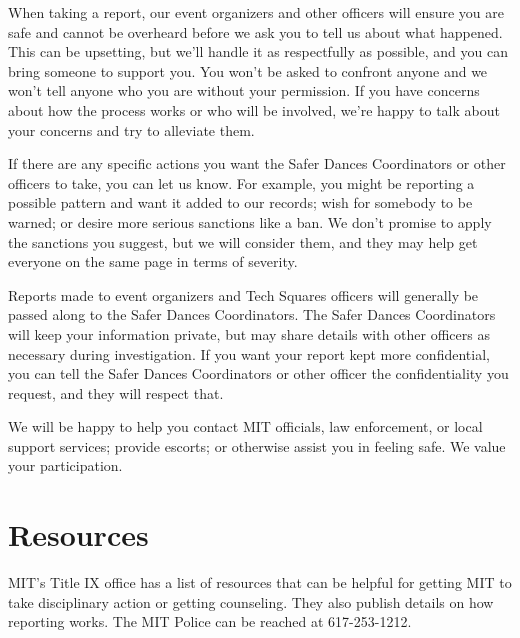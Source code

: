 \documentclass{article}
\begin{document}
When taking a report, our event organizers and other officers will ensure you are safe and cannot be overheard before we ask you to tell us about what happened. This can be upsetting, but we'll handle it as respectfully as possible, and you can bring someone to support you. You won't be asked to confront anyone and we won't tell anyone who you are without your permission. If you have concerns about how the process works or who will be involved, we're happy to talk about your concerns and try to alleviate them.

If there are any specific actions you want the Safer Dances Coordinators or other officers to take, you can let us know. For example, you might be reporting a possible pattern and want it added to our records; wish for somebody to be warned; or desire more serious sanctions like a ban. We don't promise to apply the sanctions you suggest, but we will consider them, and they may help get everyone on the same page in terms of severity.

Reports made to event organizers and Tech Squares officers will generally be passed along to the Safer Dances Coordinators. The Safer Dances Coordinators will keep your information private, but may share details with other officers as necessary during investigation. If you want your report kept more confidential, you can tell the Safer Dances Coordinators or other officer the confidentiality you request, and they will respect that.

We will be happy to help you contact MIT officials, law enforcement, or local support services; provide escorts; or otherwise assist you in feeling safe. We value your participation.

\section{Resources}

MIT's Title IX office has a list of resources that can be helpful for getting MIT to take disciplinary action or getting counseling. They also publish details on how reporting works. The MIT Police can be reached at 617-253-1212.
\end{document}

